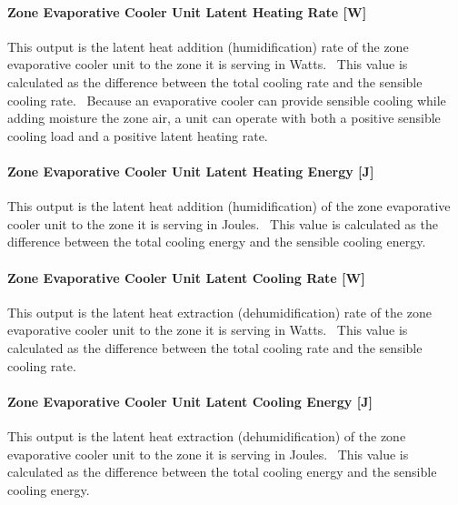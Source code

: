 \paragraph{Zone Evaporative Cooler Unit Latent Heating Rate {[}W{]}}\label{zone-evaporative-cooler-unit-latent-heating-rate-w}

This output is the latent heat addition (humidification) rate of the zone evaporative cooler unit to the zone it is serving in Watts.~ This value is calculated as the difference between the total cooling rate and the sensible cooling rate.~ Because an evaporative cooler can provide sensible cooling while adding moisture the zone air, a unit can operate with both a positive sensible cooling load and a positive latent heating rate.

\paragraph{Zone Evaporative Cooler Unit Latent Heating Energy {[}J{]}}\label{zone-evaporative-cooler-unit-latent-heating-energy-j}

This output is the latent heat addition (humidification) of the zone evaporative cooler unit to the zone it is serving in Joules.~ This value is calculated as the difference between the total cooling energy and the sensible cooling energy.

\paragraph{Zone Evaporative Cooler Unit Latent Cooling Rate {[}W{]}}\label{zone-evaporative-cooler-unit-latent-cooling-rate-w}

This output is the latent heat extraction (dehumidification) rate of the zone evaporative cooler unit to the zone it is serving in Watts.~ This value is calculated as the difference between the total cooling rate and the sensible cooling rate.

\paragraph{Zone Evaporative Cooler Unit Latent Cooling Energy {[}J{]}}\label{zone-evaporative-cooler-unit-latent-cooling-energy-j}

This output is the latent heat extraction (dehumidification) of the zone evaporative cooler unit to the zone it is serving in Joules.~ This value is calculated as the difference between the total cooling energy and the sensible cooling energy.

